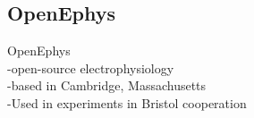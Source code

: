 \subsection{OpenEphys}
OpenEphys \\
-open-source electrophysiology \\
-based in Cambridge, Massachusetts \\
-Used in experiments in Bristol cooperation \\

 
\cleardoublepage
